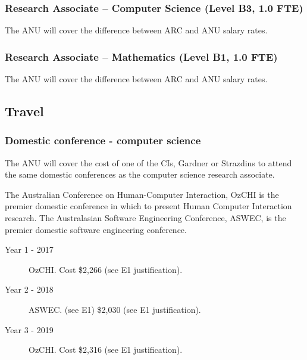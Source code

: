 \documentclass[a4paper,fontsize=12pt]{scrartcl}
\begin{document}
\subsubsection*{Research Associate – Computer Science (Level B3, 1.0 FTE)}

The ANU will cover the difference between ARC and ANU salary rates.


\subsubsection*{Research Associate – Mathematics (Level B1, 1.0 FTE)}

The ANU will cover the difference between ARC and ANU salary rates.





\subsection*{Travel}

\subsubsection*{Domestic conference - computer science}

The ANU will cover the cost of one of the CIs, Gardner or Strazdins 
to attend the  same domestic conferences as the computer science 
research associate. 

The Australian Conference on Human-Computer Interaction, OzCHI 
is the premier domestic conference in which to present 
Human Computer Interaction research. 
The Australasian Software Engineering Conference, ASWEC, 
is the premier domestic software engineering conference.

\begin{description}
\item[Year 1 - 2017] OzCHI. Cost \$2,266  (see E1 justification).

\item[Year 2 - 2018] ASWEC. (see E1) \$2,030  (see E1 justification).

\item[Year 3 -  2019] OzCHI.  Cost \$2,316 (see E1 justification).

\end{description}
\end{document}
